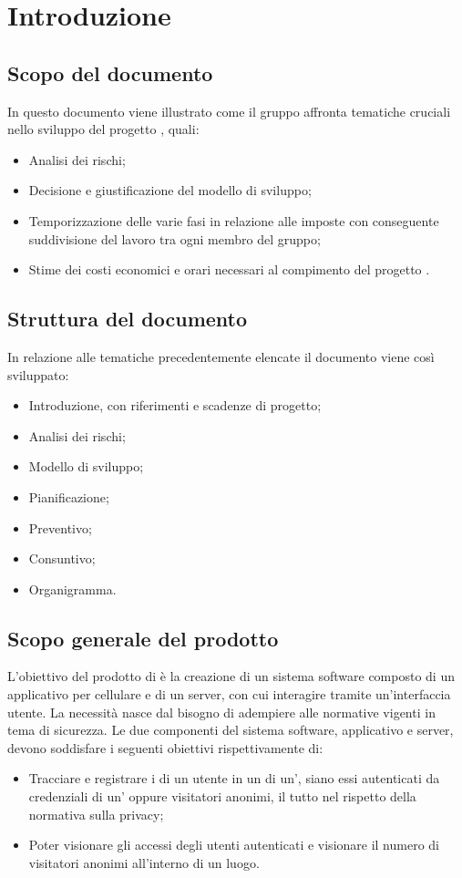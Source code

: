\section{Introduzione}
\subsection{Scopo del documento}
In questo documento viene illustrato come  il gruppo \Gruppo{} affronta tematiche cruciali nello sviluppo del progetto \NomeProgetto{}, quali:
\begin{itemize}
    \item Analisi dei rischi;
    \item Decisione e giustificazione del modello di sviluppo;
    \item Temporizzazione delle varie fasi in relazione alle  imposte con conseguente suddivisione del lavoro tra ogni membro del gruppo;
    \item Stime dei costi economici e orari necessari al compimento del progetto \NomeProgetto{}.
\end{itemize}

\subsection{Struttura del documento}
In relazione alle tematiche precedentemente elencate il documento viene così sviluppato:
\begin{itemize}
    \item Introduzione, con riferimenti e scadenze di progetto;
    \item Analisi dei rischi;
    \item Modello di sviluppo;
    \item Pianificazione;
    \item Preventivo;
    \item Consuntivo;
    \item Organigramma.
\end{itemize}

\subsection{Scopo generale del prodotto}
L'obiettivo del prodotto \NomeProgetto{} di \Proponente{} è la creazione di un sistema software composto di un applicativo per cellulare e di un server, con cui interagire tramite un'interfaccia utente. La necessità nasce dal bisogno di adempiere alle normative vigenti in tema di sicurezza.
Le due componenti del sistema software, applicativo e server, devono soddisfare i seguenti obiettivi rispettivamente di:
\begin{itemize}
\item Tracciare e registrare i  di un utente in un  di un', siano essi autenticati da credenziali di un' oppure visitatori anonimi, il tutto nel rispetto della normativa sulla privacy;
\item Poter visionare gli accessi degli utenti autenticati e visionare il numero di visitatori anonimi all'interno di un luogo.
\end{itemize}

